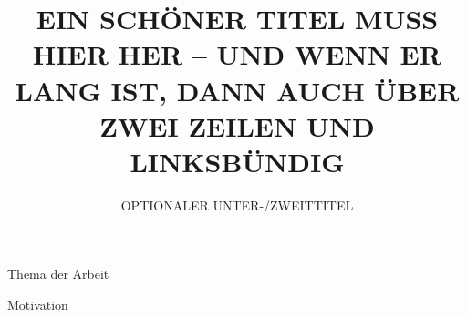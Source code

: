 \documentclass[english, ngerman, a0paper, fontsize=30pt,
cdfont=false,cdfont=nodin,cdmath=false,
cdgeometry=custom,
bleedmargin=3mm,
backgroundcolor=white,
]{./settings/tudscrposter}
\begin{document}
\sffamily

\title{\MakeTextUppercase{Ein schöner Titel muss hier her -- und wenn er lang ist, dann auch über zwei Zeilen und linksbündig}}
\subtitle{\MakeTextUppercase{Optionaler Unter-/Zweittitel}}



\maketitle





\noindent
\begin{minipage}{0.48\textwidth}
	\begin{mybox}[equal height group=A]{Thema der Arbeit}
		\blindtext
	\end{mybox}
\end{minipage}
\hfill
\begin{minipage}{0.48\textwidth}
	\begin{mybox}[equal height group=A]{Motivation}
		\blindtext[2]
	\end{mybox}
\end{minipage}



\bigskip
\end{document}

